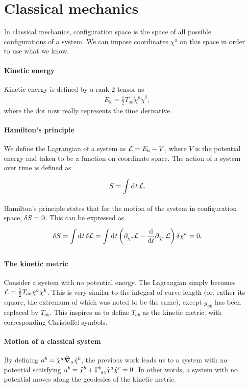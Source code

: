 \section{Classical mechanics}
In classical mechanics, configuration space is the space of all possible configurations of a system. We can impose coordinates $\chi^{a}$ on this space in order to use what we know.

\paragraph{Kinetic energy}
Kinetic energy is defined by a rank $2$ tensor as
\begin{align*}
	E_{\text{k}} = \frac{1}{2}T_{ab}\dot{\chi}^{a}\dot{\chi}^{b},
\end{align*}
where the dot now really represents the time derivative.


\paragraph{Hamilton's principle}
We define the Lagrangian of a system as $\mathcal{L} = E_{\text{k}} - V$, where $V$ is the potential energy and taken to be a function on coordinate space. The action of a system over time is defined as
\begin{align*}
	S = \int\limits_{}^{}\dd[]{t}\mathcal{L}.
\end{align*}
Hamilton's principle states that for the motion of the system in configuration space, $\delta S = 0$. This can be expressed as
\begin{align*}
	\delta S = \int\limits_{}^{}\dd[]{t}\delta \mathcal{L} = \int\limits_{}^{}\dd[]{t}\left(\partial^{}_{\chi^{a}}\mathcal{L} - \dv{t}\partial^{}_{\dot{\chi}^{a}}\mathcal{L}\right)\delta \chi^{a} = 0.
\end{align*}

\paragraph{The kinetic metric}
Consider a system with no potential energy. The Lagrangian simply becomes $\mathcal{L} = \frac{1}{2}T_{ab}\dot{\chi}^{a}\dot{\chi}^{b}$. This is very similar to the integral of curve length (or, rather its square, the extremum of which was noted to be the same), except $g_{ab}$ has been replaced by $T_{ab}$. This inspires us to define $T_{ab}$ as the kinetic metric, with corresponding Christoffel symbols.

\paragraph{Motion of a classical system}
By defining $a^{b} = \dot{\chi}^{a}\grad_{a}{\dot{\chi}^{b}}$, the previous work leads us to a system with no potential satisfying $a^{b} = \ddot{\chi}^{b} + \Gamma^{b}_{\;ac}\dot{\chi}^{a}\dot{\chi}^{c} = 0$. In other words, a system with no potential moves along the geodesics of the kinetic metric.

